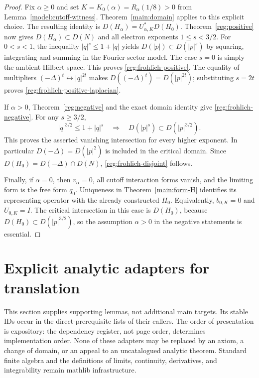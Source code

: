 \documentclass[11pt,a4paper]{article}
\theoremstyle{definition}
\theoremstyle{remark}
\begin{document}
\begin{proof}
Fix \(\alpha\geq0\) and set $K=K_0(\alpha)=R_\alpha(1/8)>0$
from Lemma~\ref{model:cutoff-witness}. Theorem~\ref{main:domain}
applies to this explicit choice. The resulting identity is
\(D(H_\alpha)=U_{\alpha,K}^*D(H_0)\).
Theorem~\ref{reg:positive} now gives \(D(H_\alpha)\subset D(N)\)
and all electron exponents \(1\leq s<3/2\). For
\(0<s<1\), the inequality \(|q|^s\leq1+|q|\) yields
\(D(|p|)\subset D(|p|^s)\) by squaring, integrating and summing
in the Fourier-sector model. The case \(s=0\) is simply the ambient
Hilbert space. This proves \eqref{reg:frohlich-positive}.
The equality of multipliers
\((-\Delta)^t\leftrightarrow|q|^{2t}\) makes
\(D((-\Delta)^t)=D(|p|^{2t})\); substituting \(s=2t\)
proves \eqref{reg:frohlich-positive-laplacian}.

If \(\alpha>0\), Theorem~\ref{reg:negative} and the exact domain
identity give \eqref{reg:frohlich-negative}. For any
\(s\geq3/2\),
\[
 |q|^{3/2}\leq1+|q|^s
 \quad\Longrightarrow\quad
 D(|p|^s)\subset D(|p|^{3/2}).
\]
This proves the asserted vanishing intersection for every higher
exponent. In particular \(D(-\Delta)=D(|p|^2)\) is included in
the critical domain. Since
\(D(H_0)=D(-\Delta)\cap D(N)\),
\eqref{reg:frohlich-disjoint} follows.

Finally, if \(\alpha=0\), then \(v_\alpha=0\), all cutoff
interaction forms vanish, and the limiting form is the free form
\(q_0\). Uniqueness in Theorem~\ref{main:form-H} identifies its
representing operator with the already constructed \(H_0\).
Equivalently, \(b_{0,K}=0\) and \(U_{0,K}=I\). The critical
intersection in this case is \(D(H_0)\), because
\(D(H_0)\subset D(|p|^{3/2})\), so the assumption
\(\alpha>0\) in the negative statements is essential.
\end{proof}

\section{Explicit analytic adapters for translation}
\label{sec:translation-bridges}
This section supplies supporting lemmas, not additional main targets.
Its stable IDs occur in the direct-prerequisite lists of their callers.
The order of presentation is expository: the dependency register, not
page order, determines implementation order. None of these adapters may
be replaced by an axiom, a change of domain, or an appeal to an uncatalogued
analytic theorem. Standard finite algebra and the definitions of limits,
continuity, derivatives, and integrability remain mathlib infrastructure.
\end{document}
